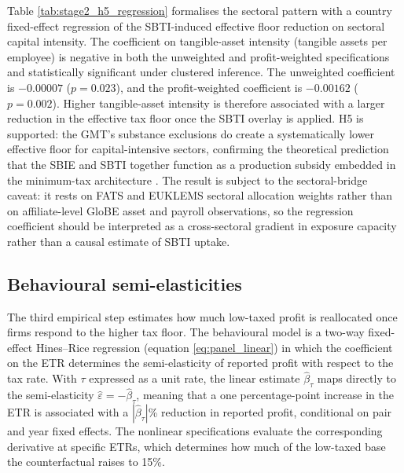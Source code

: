 \documentclass[11pt,a4paper]{article}
\begin{document}
Table \ref{tab:stage2_h5_regression} formalises the sectoral pattern with a country fixed-effect regression of the SBTI-induced effective floor reduction on sectoral capital intensity. The coefficient on tangible-asset intensity (tangible assets per employee) is negative in both the unweighted and profit-weighted specifications and statistically significant under clustered inference. The unweighted coefficient is $-0.00007$ ($p=0.023$), and the profit-weighted coefficient is $-0.00162$ ($p=0.002$). Higher tangible-asset intensity is therefore associated with a larger reduction in the effective tax floor once the SBTI overlay is applied. H5 is supported: the GMT's substance exclusions do create a systematically lower effective floor for capital-intensive sectors, confirming the theoretical prediction that the SBIE and SBTI together function as a production subsidy embedded in the minimum-tax architecture \citep{schjelderup2024}. The result is subject to the sectoral-bridge caveat: it rests on FATS and EUKLEMS sectoral allocation weights rather than on affiliate-level GloBE asset and payroll observations, so the regression coefficient should be interpreted as a cross-sectoral gradient in exposure capacity rather than a causal estimate of SBTI uptake.

\subsection{Behavioural semi-elasticities}\label{sec:results_stage3}

The third empirical step estimates how much low-taxed profit is reallocated once firms respond to the higher tax floor. The behavioural model is a two-way fixed-effect Hines--Rice regression (equation \ref{eq:panel_linear}) in which the coefficient on the ETR determines the semi-elasticity of reported profit with respect to the tax rate. With $\tau$ expressed as a unit rate, the linear estimate $\hat{\beta}_{\tau}$ maps directly to the semi-elasticity $\hat{\varepsilon}=-\hat{\beta}_{\tau}$, meaning that a one percentage-point increase in the ETR is associated with a $|\hat{\beta}_{\tau}|$\% reduction in reported profit, conditional on pair and year fixed effects. The nonlinear specifications evaluate the corresponding derivative at specific ETRs, which determines how much of the low-taxed base the counterfactual raises to 15\%.


\end{document}
